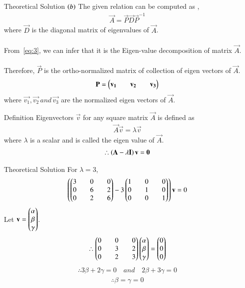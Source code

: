 \documentclass{beamer}
\begin{document}
\begin{frame}{Theoretical Solution}
$\left(b\right)$ The given relation can be computed as ,
\begin{align}
    \vec{A}=\vec{P}\vec{D}\vec{P}^{-1} \label{eq:3}
\end{align}
where $\vec{D}$ is the diagonal matrix of eigenvalues of $\vec{A}$.\\
\\
From~\eqref{eq:3}, we can infer that it is the Eigen-value decomposition of matrix $\vec{A}$.\\
\\
Therefore, $\vec{P}$ is the ortho-normalized matrix of collection of eigen vectors of $\vec{A}$.
\begin{align}
    \mathbf{P}=\begin{pmatrix}\mathbf{v_1}&&\mathbf{v_2}&&\mathbf{v_3}\end{pmatrix}
\end{align}
where $\vec{v_1},\vec{v_2} \,and\, \vec{v_3}$ are the normalized eigen vectors of $\vec{A}$.
\end{frame}

\begin{frame}{Definition}
Eigenvectors $\vec{v}$ for any square matrix $\vec{A}$ is defined as 
\begin{align}
    \vec{A}\vec{v}=\lambda\vec{v}
\end{align}
where $\lambda$ is a scalar and is called the eigen value of $\vec{A}$.
\begin{align}
    \therefore \left(\mathbf{A}-\lambda\mathbf{I}\right)\mathbf{v}=\mathbf{0}
\end{align}
\end{frame}

\begin{frame}{Theoretical Solution}
For $\lambda=3$,
\begin{align}
    \left(\begin{pmatrix}3&&0&&0\\0&&6&&2\\0&&2&&6\end{pmatrix}-3\begin{pmatrix}1&&0&&0\\0&&1&&0\\0&&0&&1\end{pmatrix}\right)\mathbf{v}=0
\end{align}
Let $\mathbf{v}=\begin{pmatrix}\alpha\\\beta\\\gamma\end{pmatrix}$.
\begin{align}
    \therefore \begin{pmatrix}0&&0&&0\\0&&3&&2\\0&&2&&3\end{pmatrix}\begin{pmatrix}\alpha\\\beta\\\gamma\end{pmatrix}=\begin{pmatrix}0\\0\\0\end{pmatrix} 
\end{align}
\begin{align}
    \therefore 3\beta+2\gamma=0 \quad and \quad 2\beta+3\gamma=0
\end{align}
\begin{align}
    \therefore \beta=\gamma=0
\end{align}
\end{frame}
\end{document}
